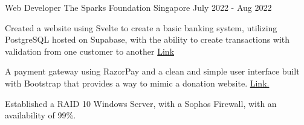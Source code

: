\begin{cventries}
    
    \cventry
    {Web Developer} %
    {The Sparks Foundation} %
    {Singapore} %
    {July 2022 - Aug 2022} %
    {
      \begin{cvitems} %
        \item {Created a website using Svelte to create a basic banking system, utilizing PostgreSQL hosted on Supabase, with the ability to create transactions with validation from one customer to another \href{https://tsf-intern.vercel.app/}{Link}}
        \item {A payment gateway using RazorPay and a clean and simple user interface built with Bootstrap that provides a way to mimic a donation website. \href{https://tsf-intern2.vercel.app}{Link.}}
        \item {Established a RAID 10 Windows Server, with a Sophos Firewall, with an availability of 99\%.}
      \end{cvitems}
    }
\end{cventries}
